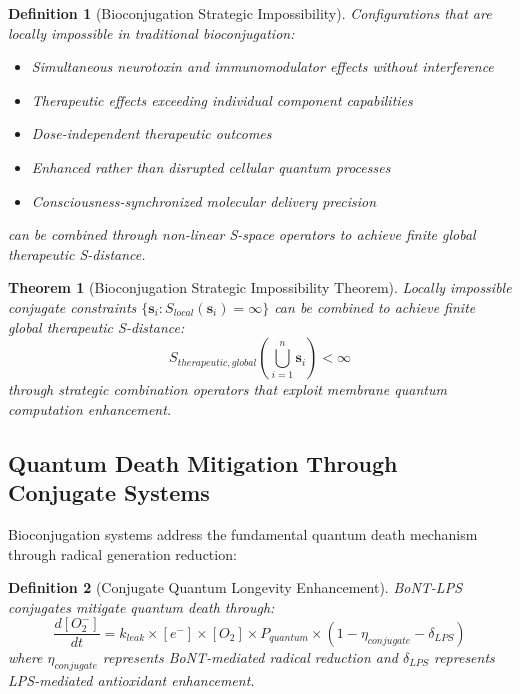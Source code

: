 \documentclass[12pt,a4paper]{article}
\newtheorem{theorem}{Theorem}
\newtheorem{definition}{Definition}
\begin{document}
\begin{definition}[Bioconjugation Strategic Impossibility]
Configurations that are locally impossible in traditional bioconjugation:
\begin{itemize}
\item Simultaneous neurotoxin and immunomodulator effects without interference
\item Therapeutic effects exceeding individual component capabilities
\item Dose-independent therapeutic outcomes
\item Enhanced rather than disrupted cellular quantum processes
\item Consciousness-synchronized molecular delivery precision
\end{itemize}
can be combined through non-linear S-space operators to achieve finite global therapeutic S-distance.
\end{definition}

\begin{theorem}[Bioconjugation Strategic Impossibility Theorem]
Locally impossible conjugate constraints $\{\mathbf{s}_i : S_{local}(\mathbf{s}_i) = \infty\}$ can be combined to achieve finite global therapeutic S-distance:
\begin{equation}
S_{therapeutic,global}\left(\bigcup_{i=1}^n \mathbf{s}_i\right) < \infty
\end{equation}
through strategic combination operators that exploit membrane quantum computation enhancement.
\end{theorem}

\subsection{Quantum Death Mitigation Through Conjugate Systems}

Bioconjugation systems address the fundamental quantum death mechanism through radical generation reduction:

\begin{definition}[Conjugate Quantum Longevity Enhancement]
BoNT-LPS conjugates mitigate quantum death through:
\begin{equation}
\frac{d[O_2^-]}{dt} = k_{leak} \times [e^-] \times [O_2] \times P_{quantum} \times (1 - \eta_{conjugate} - \delta_{LPS})
\end{equation}
where $\eta_{conjugate}$ represents BoNT-mediated radical reduction and $\delta_{LPS}$ represents LPS-mediated antioxidant enhancement.
\end{definition}
\end{document}
